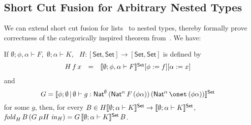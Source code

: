 \documentclass[runningheads]{llncs}
\newcommand{\set}{\mathsf{Set}}
\begin{document}
\subsection{Short Cut Fusion for Arbitrary Nested
  Types}\label{sec:short-cut-nested} 


We can extend short cut fusion for lists~\cite{glp93} to nested
types, thereby
formally prove correctness of the categorically
inspired
theorem from~\cite{jg10}.
We have:
\begin{theorem}\label{thm:short-cut-nested}
If $\emptyset;\phi,\alpha \vdash F$, \,$\emptyset; \alpha
\vdash K$, \,
$H : [\set,\set] \to [\set,\set]$ is defined by
\[\begin{array}{lll}
H\,f\,x & = & \setsem{\emptyset; \phi, \alpha \vdash F}[\phi :=
  f][\alpha := x]\\
\end{array}\]
and 
\[G = \setsem{\phi;\emptyset\,|\,\emptyset \vdash g :
\Nat^\emptyset\,(\Nat^\alpha\,F\,(\phi\alpha))\,(\Nat^\alpha\,\onet \,
(\phi\alpha))}\] for some $g$, then, for every $B \in H
\setsem{\emptyset;\alpha \vdash K} \rightarrow \setsem{\emptyset;
  \alpha \vdash K}$,
$\mathit{fold}_{H}\, B \, (G\; \mu H \; \mathit{in}_{H}) = G
\,\setsem{\emptyset;\alpha \vdash K}\, B$.
\end{theorem}
\end{document}
